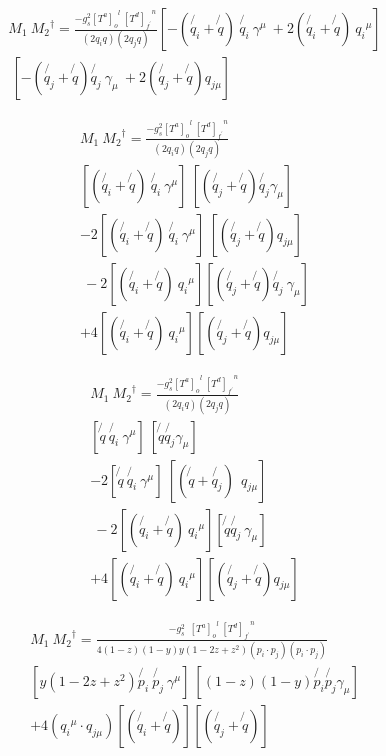 \begin{equation}
\begin{split}
M_1\: {M_2}^{\dagger} = \frac{-g_s^2 {[T^a]_o}^l \:{[T^d]_{f^{\prime}}}^n }{(2q_i q)(2q_j q)} [-(\not{q_i} + \not{q})\:\not{q_i}\: \gamma^{\mu} \:+2(\not{q_i} + \not{q})\:{q_{i}}^{\mu}]\\
\:[-(\not{q_j} + \not{q}) \not{q_j} \:\gamma_{\mu} \: + 2(\not{q_j} + \not{q}) {q_{j{\mu}}}]\:
\end{split}
\end{equation}


\begin{equation}
\begin{split}
M_1\: {M_2}^{\dagger} = \frac{-g_s^2 {[T^a]_o}^l \:{[T^d]_{f^{\prime}}}^n }{(2q_i q)(2q_j q)} \\
[(\not{q_i} + \not{q})\:\not{q_i}\: \gamma^{\mu}] \:[(\not{q_j} + \not{q}) \not{q_j} \gamma_{\mu}] \\
-2[(\not{q_i} + \not{q})\:\not{q_i}\: \gamma^{\mu}]\:[ (\not{q_j} + \not{q}) {q_{j{\mu}}}]\\
\:-2[(\not{q_i} + \not{q})\:{q_{i}}^{\mu}][(\not{q_j} + \not{q}) \not{q_j} \:\gamma_{\mu}]\\
+4[(\not{q_i} + \not{q})\:{q_{i}}^{\mu}][(\not{q_j} + \not{q}) {q_{j{\mu}}}]
\end{split}
\end{equation}

\begin{equation}
\begin{split}
M_1\: {M_2}^{\dagger} = \frac{-g_s^2 {[T^a]_o}^l \:{[T^d]_{f^{\prime}}}^n }{(2q_i q)(2q_j q)} \\
[\not{q}\:\not{q_i}\: \gamma^{\mu}] \:[\not{q} \not{q_j} \gamma_{\mu}] \\
-2[\not{q}\:\not{q_i}\: \gamma^{\mu}]\:[(\not{q}+\not{q_j}) \: \: {q_{j{\mu}}}]\\
\:-2[(\not{q_i} + \not{q})\:{q_{i}}^{\mu}][\not{q} \not{q_j} \:\gamma_{\mu}]\\
+4[(\not{q_i} + \not{q})\:{q_{i}}^{\mu}][(\not{q_j} + \not{q}) {q_{j{\mu}}}]
\end{split}
\end{equation}

\begin{equation}
\begin{split}
M_1\: {M_2}^{\dagger} = \frac{-g_s^2 \:\:{[T^a]_o}^l \:{[T^d]_{f^{\prime}}}^n }{4(1-z)(1-y)y(1-2z+z^2)(p_i \cdot p_j)(p_i \cdot p_j)} \\
[y(1-2z+z^2)\not{p_i}\:\not{p_j}\: \gamma^{\mu}] \:[(1-z)(1-y)\not{p_i} \not{p_j} \gamma_{\mu}] \\
+4({q_{i}}^{\mu} \cdot {q_{j{\mu}}})[(\not{q_i} + \not{q})][(\not{q_j} + \not{q})]
\end{split}
\end{equation}

